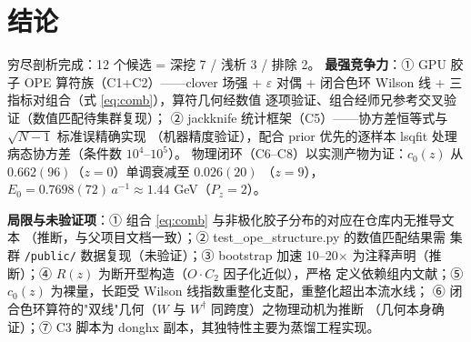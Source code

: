 \documentclass[UTF8]{ctexart}
\begin{document}
\section{结论}

\begin{conclbox}
穷尽剖析完成：12 个候选 = \textcolor{phys}{深挖 7 / 浅析 3 / 排除 2}。
\textbf{最强竞争力}：① \textcolor{phys}{GPU 胶子 OPE 算符族}（C1+C2）——clover 场强 +
$\varepsilon$ 对偶 + 闭合色环 Wilson 线 + 三指标对组合（式 \eqref{eq:comb}），算符几何经数值
逐项验证、组合经师兄参考交叉验证（数值匹配待集群复现）；
② \textcolor{phys}{jackknife 统计框架}（C5）——协方差恒等式与 $\sqrt{N-1}$ 标准误精确实现
（机器精度验证），配合 prior 优先的逐样本 lsqfit 处理病态协方差（条件数 $10^4$--$10^5$）。
物理闭环（C6--C8）以实测产物为证：$c_0(z)$ 从 $0.662(96)$（$z=0$）单调衰减至 $0.026(20)$
（$z=9$），$E_0=0.7698(72)\,a^{-1}\approx1.44$ GeV（$P_z=2$）。
\end{conclbox}

\begin{warnbox}
\textbf{局限与未验证项}：① 组合 \eqref{eq:comb} 与非极化胶子分布的对应在仓库内无推导文本
（\textcolor{phys}{推断}，与父项目文档一致）；② test\_ope\_structure.py 的数值匹配结果需
集群 \texttt{/public/} 数据复现（\textcolor{warn}{未验证}）；③ bootstrap 加速 10--20$\times$
为注释声明（\textcolor{phys}{推断}）；④ $R(z)$ 为断开型构造（$O\cdot C_2$ 因子化近似），严格
定义依赖组内文献；⑤ $c_0(z)$ 为裸量，长距受 Wilson 线指数重整化支配，重整化超出本流水线；
⑥ 闭合色环算符的"双线"几何（$W$ 与 $W^\dagger$ 同跨度）之物理动机为\textcolor{phys}{推断}
（几何本身确证）；⑦ C3 脚本为 donghx 副本，其独特性主要为蒸馏工程实现。
\end{warnbox}
\end{document}

